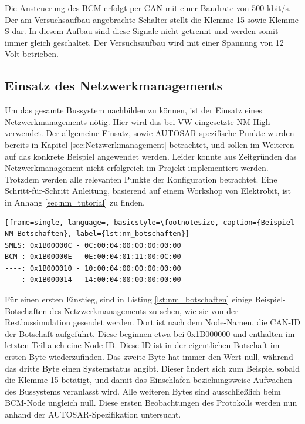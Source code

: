 \documentclass[
  a4paper,					    %
  twoside,
  DIV=calc,     				%
  bibliography=totoc,
  cleardoublepage=empty,
  ngerman,     					%
  final       					%
]{scrbook}
\begin{document}
Die Ansteuerung des BCM erfolgt per CAN mit einer Baudrate von 500 kbit/s. Der am Versuchsaufbau angebrachte Schalter stellt die Klemme 15 sowie Klemme S dar. In diesem Aufbau sind diese Signale nicht getrennt und werden somit immer gleich geschaltet. Der Versuchsaufbau wird mit einer Spannung von 12 Volt betrieben.




\subsection{Einsatz des Netzwerkmanagements}
\label{sec:AutosarNM}
Um das gesamte Bussystem nachbilden zu können, ist der Einsatz eines Netzwerkmanagements nötig. Hier wird das bei VW eingesetzte NM-High verwendet. Der allgemeine Einsatz, sowie AUTOSAR-spezifische Punkte wurden bereits in Kapitel \ref{sec:Netzwerkmanagement} betrachtet, und sollen im Weiteren auf das konkrete Beispiel angewendet werden. Leider konnte aus Zeitgründen das Netzwerkmanagement nicht erfolgreich im Projekt implementiert werden. Trotzdem werden alle relevanten Punkte der Konfiguration betrachtet. Eine Schritt-für-Schritt Anleitung, basierend auf einem Workshop von Elektrobit, ist in Anhang \ref{sec:nm_tutorial} zu finden.

\begin{lstlisting}[frame=single, language=, basicstyle=\footnotesize, caption={Beispiel NM Botschaften}, label={lst:nm_botschaften}]
SMLS: 0x1B00000C - 0C:00:04:00:00:00:00:00
BCM : 0x1B00000E - 0E:00:04:01:11:00:0C:00
----: 0x1B000010 - 10:00:04:00:00:00:00:00
----: 0x1B000014 - 14:00:04:00:00:00:00:00
\end{lstlisting}

Für einen ersten Einstieg, sind in Listing \ref{lst:nm_botschaften} einige Beispiel-Botschaften des Netzwerkmanagements zu sehen, wie sie von der Restbussimulation gesendet werden. Dort ist nach dem Node-Namen, die CAN-ID der Botschaft aufgeführt. Diese beginnen etwa bei 0x1B000000 und enthalten im letzten Teil auch eine Node-ID. Diese ID ist in der eigentlichen Botschaft im ersten Byte wiederzufinden. Das zweite Byte hat immer den Wert null, während das dritte Byte einen Systemstatus angibt. Dieser ändert sich zum Beispiel sobald die Klemme 15 betätigt, und damit das Einschlafen beziehungsweise Aufwachen des Bussystems veranlasst wird. Alle weiteren Bytes sind ausschließlich beim BCM-Node ungleich null. Diese ersten Beobachtungen des Protokolls werden nun anhand der AUTOSAR-Spezifikation untersucht.
\end{document}
